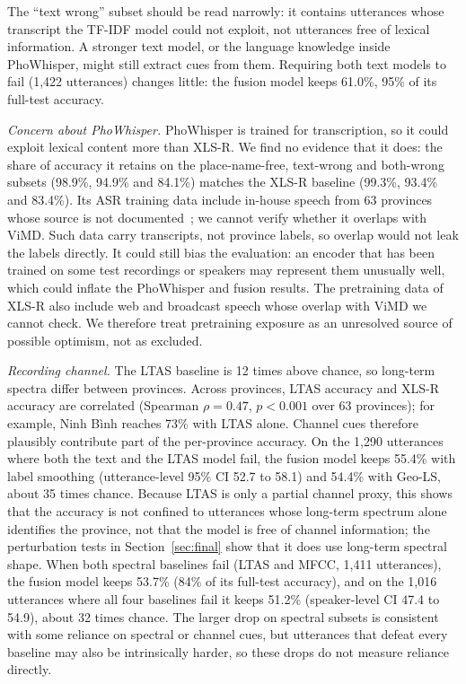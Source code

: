 \documentclass[conference]{IEEEtran}
\newcommand{\vn}[1]{\foreignlanguage{vietnamese}{#1}}
\begin{document}
The ``text wrong'' subset should be read narrowly: it contains utterances whose transcript the TF-IDF model could not exploit, not utterances free of lexical information. A stronger text model, or the language knowledge inside PhoWhisper, might still extract cues from them. Requiring both text models to fail (1,422 utterances) changes little: the fusion model keeps 61.0\%, 95\% of its full-test accuracy.

\textit{Concern about PhoWhisper.} PhoWhisper is trained for transcription, so it could exploit lexical content more than XLS-R. We find no evidence that it does: the share of accuracy it retains on the place-name-free, text-wrong and both-wrong subsets (98.9\%, 94.9\% and 84.1\%) matches the XLS-R baseline (99.3\%, 93.4\% and 83.4\%). Its ASR training data include in-house speech from 63 provinces whose source is not documented~\cite{phowhisper}; we cannot verify whether it overlaps with ViMD. Such data carry transcripts, not province labels, so overlap would not leak the labels directly. It could still bias the evaluation: an encoder that has been trained on some test recordings or speakers may represent them unusually well, which could inflate the PhoWhisper and fusion results. The pretraining data of XLS-R also include web and broadcast speech whose overlap with ViMD we cannot check. We therefore treat pretraining exposure as an unresolved source of possible optimism, not as excluded.

\textit{Recording channel.} The LTAS baseline is 12 times above chance, so long-term spectra differ between provinces. Across provinces, LTAS accuracy and XLS-R accuracy are correlated (Spearman $\rho = 0.47$, $p < 0.001$ over 63 provinces); for example, \vn{Ninh Bình} reaches 73\% with LTAS alone. Channel cues therefore plausibly contribute part of the per-province accuracy. On the 1,290 utterances where both the text and the LTAS model fail, the fusion model keeps 55.4\% with label smoothing (utterance-level 95\% CI 52.7 to 58.1) and 54.4\% with Geo-LS, about 35 times chance. Because LTAS is only a partial channel proxy, this shows that the accuracy is not confined to utterances whose long-term spectrum alone identifies the province, not that the model is free of channel information; the perturbation tests in Section~\ref{sec:final} show that it does use long-term spectral shape. When both spectral baselines fail (LTAS and MFCC, 1,411 utterances), the fusion model keeps 53.7\% (84\% of its full-test accuracy), and on the 1,016 utterances where all four baselines fail it keeps 51.2\% (speaker-level CI 47.4 to 54.9), about 32 times chance. The larger drop on spectral subsets is consistent with some reliance on spectral or channel cues, but utterances that defeat every baseline may also be intrinsically harder, so these drops do not measure reliance directly.
\end{document}
